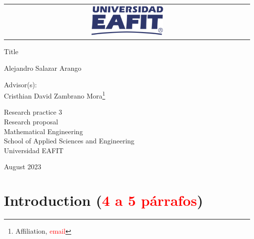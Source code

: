 \documentclass[12pt,letterpaper]{article}
\begin{document}
\begin{titlepage}

\Large
\sffamily

\begin{center}
  \begin{tabular}{c}
    \includegraphics[width=0.30\textwidth]{logo-eafit.png}
  \end{tabular}
\end{center}

\vfill
\begin{center}
  \LARGE Title
\end{center}

\vspace*{1cm}
\centerline{\LARGE Alejandro Salazar Arango\footnotemark}  
\vfill

\begin{center}
Advisor(s): \\
Cristhian David Zambrano Mora\footnote{Affiliation, \textcolor{red}{email}}   \\
\end{center}

\vfill

\begin{center}
  \large
    Research practice 3 \\
  Research proposal \\
  Mathematical Engineering\\
  School of Applied Sciences and Engineering\\
  Universidad EAFIT \\
\end{center}

\vfill
\centerline{August 2023}
\vspace*{0.7cm}
\end{titlepage}


\section{Introduction (\textcolor{red}{4 a 5 párrafos})}

\end{document}
